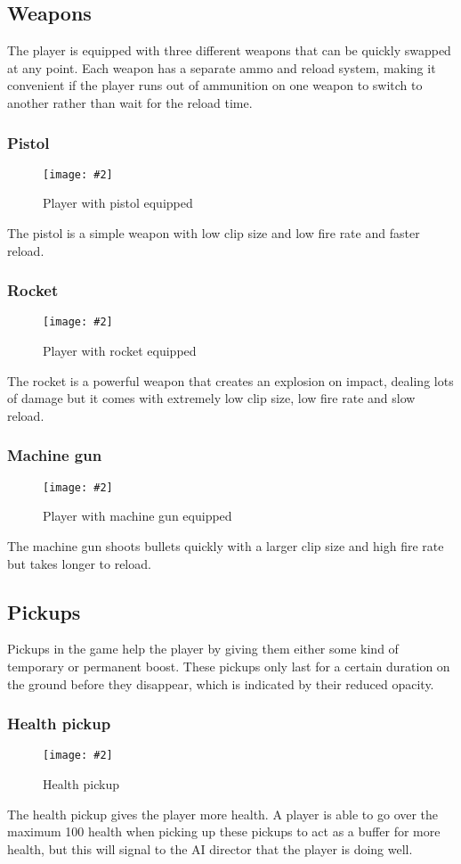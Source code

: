 \documentclass{article}
\newcommand{\figimg}[3]{
  \begin{figure}[H]
    \centering
    \texttt{[image: \#2]}
    \caption{#3}
  \end{figure}
  \noindent 
}
\begin{document}
\subsection{Weapons}
The player is equipped with three different weapons that can be quickly swapped at any point. Each weapon has a separate ammo and reload system, making it convenient if the player runs out of ammunition on one weapon to switch to another rather than wait for the reload time.
\subsubsection{Pistol}
\figimg{0.1}{imgs/Gun.png}{Player with pistol equipped}
The pistol is a simple weapon with low clip size and low fire rate and faster reload.

\subsubsection{Rocket}
\figimg{0.1}{imgs/Rocket.png}{Player with rocket equipped}
The rocket is a powerful weapon that creates an explosion on impact, dealing lots of damage but it comes with extremely low clip size, low fire rate and slow reload.

\subsubsection{Machine gun}
\figimg{0.1}{imgs/MachineGun.png}{Player with machine gun equipped}
The machine gun shoots bullets quickly with a larger clip size and high fire rate but takes longer to reload.


\subsection{Pickups}
Pickups in the game help the player by giving them either some kind of temporary or permanent boost. These pickups only last for a certain duration on the ground before they disappear, which is indicated by their reduced opacity.
\subsubsection{Health pickup}
\figimg{0.1}{imgs/HealthPickup.png}{Health pickup}
The health pickup gives the player more health. A player is able to go over the maximum 100 health when picking up these pickups to act as a buffer for more health, but this will signal to the AI director that the player is doing well.
\end{document}

